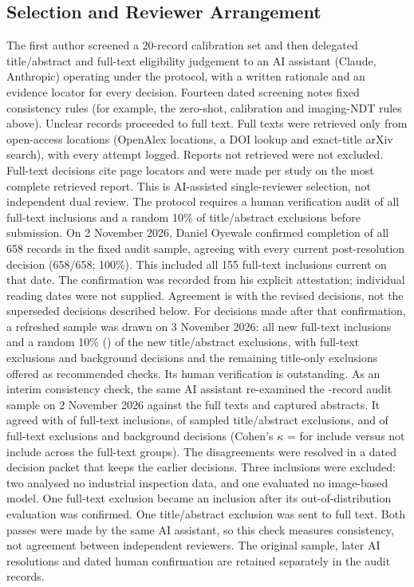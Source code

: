 \documentclass[journal]{IEEEtran}
\begin{document}
\subsection{Selection and Reviewer Arrangement}
\label{sec:selection}
The first author screened a 20-record calibration set and then delegated title/abstract and full-text eligibility judgement to an AI assistant (Claude, Anthropic) operating under the protocol, with a written rationale and an evidence locator for every decision. Fourteen dated screening notes fixed consistency rules (for example, the zero-shot, calibration and imaging-NDT rules above). Unclear records proceeded to full text. Full texts were retrieved only from open-access locations (OpenAlex locations, a DOI lookup and exact-title arXiv search), with every attempt logged. Reports not retrieved were not excluded. Full-text decisions cite page locators and were made per study on the most complete retrieved report. This is AI-assisted single-reviewer selection, not independent dual review. The protocol requires a human verification audit of all full-text inclusions and a random 10\% of title/abstract exclusions before submission. On 2 November 2026, Daniel Oyewale confirmed completion of all 658 records in the fixed audit sample, agreeing with every current post-resolution decision (658/658; 100\%). This included all 155 full-text inclusions current on that date. The confirmation was recorded from his explicit attestation; individual reading dates were not supplied. Agreement is with the revised decisions, not the superseded decisions described below. For decisions made after that confirmation, a refreshed sample was drawn on 3 November 2026: all \nRefreshA{} new full-text inclusions and a random 10\% (\nRefreshB) of the \nRefreshTAExcl{} new title/abstract exclusions, with \nRefreshC{} full-text exclusions and background decisions and the \nRefreshD{} remaining title-only exclusions offered as recommended checks. Its human verification is outstanding. As an interim consistency check, the same AI assistant re-examined the \nAuditRows{}-record audit sample on 2 November 2026 against the full texts and captured abstracts. It agreed with \nAuditAgreeA{} of \nAuditA{} full-text inclusions, \nAuditAgreeB{} of \nAuditB{} sampled title/abstract exclusions, and \nAuditAgreeC{} of \nAuditC{} full-text exclusions and background decisions (Cohen's $\kappa$ = \kappaAuditAC{} for include versus not include across the full-text groups). The \nAuditRevised{} disagreements were resolved in a dated decision packet that keeps the earlier decisions. Three inclusions were excluded: two analysed no industrial inspection data, and one evaluated no image-based model. One full-text exclusion became an inclusion after its out-of-distribution evaluation was confirmed. One title/abstract exclusion was sent to full text. Both passes were made by the same AI assistant, so this check measures consistency, not agreement between independent reviewers.
The original sample, later AI resolutions and dated human confirmation are retained separately in the audit records.
\end{document}

